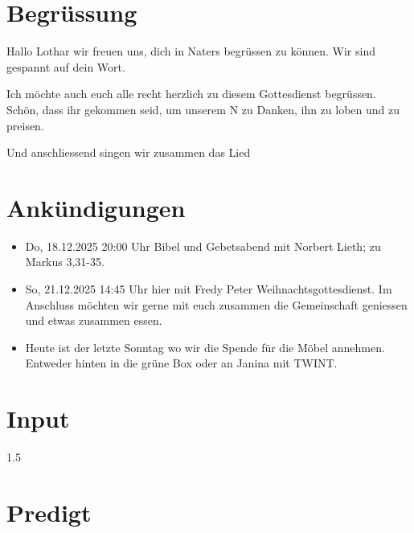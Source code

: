 \documentclass{mybib}
\newcommand{\Name}{Lothar}
\begin{document}
\section{Begrüssung}
Hallo \Name{} wir freuen uns, dich in Naters begrüssen zu können. Wir sind gespannt auf dein Wort.

Ich möchte auch euch alle recht herzlich zu diesem Gottesdienst begrüssen. Schön, dass ihr gekommen seid, um unserem \herr N zu Danken, ihn zu loben und zu preisen.

\beten{} Und anschliessend singen wir zusammen das Lied


\section{Ankündigungen}
\begin{itemize}
    \item {} Do, 18.12.2025 20:00 Uhr Bibel und Gebetsabend mit Norbert Lieth; zu Markus 3,31-35.
    \item {} So, 21.12.2025 14:45 Uhr hier mit Fredy Peter Weihnachtsgottesdienst. Im Anschluss möchten wir gerne mit euch zusammen die Gemeinschaft geniessen und etwas zusammen essen.
    \item {} Heute ist der letzte Sonntag wo wir die Spende für die Möbel annehmen. Entweder hinten in die grüne Box oder an Janina mit TWINT.
\end{itemize}

\section{ Input }
\begin{spacing}{1.5}
    
   
\end{spacing}

\section{Predigt}



\end{document}
